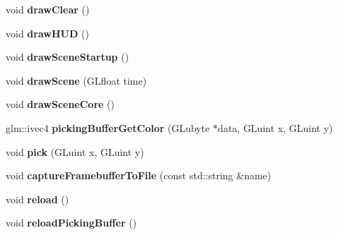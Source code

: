 \begin{DoxyCompactItemize}
\mbox{\label{structflw_1_1Engine_1_1EngineImpl_a75ac51c9020e6846b47b3f7868e13705}} 
void {\bfseries draw\+Clear} ()
\item 
\mbox{\label{structflw_1_1Engine_1_1EngineImpl_aa1fbe99251c79b9142f3b9cfaa6462a7}} 
void {\bfseries draw\+H\+UD} ()
\item 
\mbox{\label{structflw_1_1Engine_1_1EngineImpl_a94c04bf9f125dd4630e03c0abcdc3ffd}} 
void {\bfseries draw\+Scene\+Startup} ()
\item 
\mbox{\label{structflw_1_1Engine_1_1EngineImpl_a867ffca54fab598eef5e05bc302c179a}} 
void {\bfseries draw\+Scene} (G\+Lfloat time)
\item 
\mbox{\label{structflw_1_1Engine_1_1EngineImpl_a0f7c05ade556f9fab1bcaeb94804f5b6}} 
void {\bfseries draw\+Scene\+Core} ()
\item 
\mbox{\label{structflw_1_1Engine_1_1EngineImpl_a2b8f6e91e4c4bdb9d29b4489a44c9613}} 
glm\+::ivec4 {\bfseries picking\+Buffer\+Get\+Color} (G\+Lubyte $\ast$data, G\+Luint x, G\+Luint y)
\item 
\mbox{\label{structflw_1_1Engine_1_1EngineImpl_abd543f1fa91759fa742fcdcd7482adf5}} 
void {\bfseries pick} (G\+Luint x, G\+Luint y)
\item 
\mbox{\label{structflw_1_1Engine_1_1EngineImpl_a690c2a840d403472c0edc72677b1e0b3}} 
void {\bfseries capture\+Framebuffer\+To\+File} (const std\+::string \&name)
\item 
\mbox{\label{structflw_1_1Engine_1_1EngineImpl_a919a10526e2d3b4895b29b10d505de58}} 
void {\bfseries reload} ()
\item 
\mbox{\label{structflw_1_1Engine_1_1EngineImpl_a7c34a8957890b9dc3f615c728b5e66ce}} 
void {\bfseries reload\+Picking\+Buffer} ()
\end{DoxyCompactItemize}
